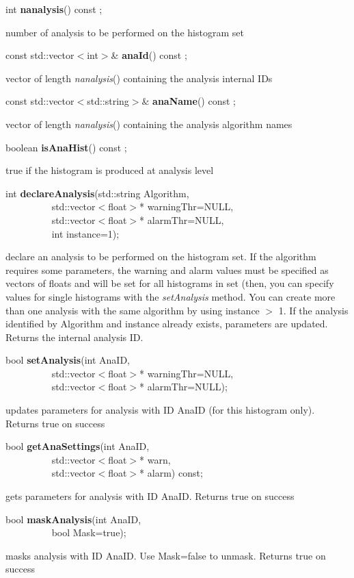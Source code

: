 \item    int {\bf nanalysis}() const ;

 number of analysis to be performed on the histogram set


\item    const std::vector$<$int$>$\& {\bf anaId}() const ;

 vector of length {\it  nanalysis}() containing the analysis internal IDs


\item    const std::vector$<$std::string$>$\& {\bf anaName}() const ;

 vector of length {\it  nanalysis}() containing the analysis algorithm names


\item    boolean {\bf isAnaHist}() const ;

 true if the histogram is produced at analysis level


\item    int {\bf declareAnalysis}(std::string Algorithm,\\\mbox{}~~~~~~~~~ 
		      std::vector$<$float$>$* warningThr=NULL,\\\mbox{}~~~~~~~~~ 
		      std::vector$<$float$>$* alarmThr=NULL,\\\mbox{}~~~~~~~~~ 
		      int instance=1);

 declare an analysis to be performed on the histogram set. If the algorithm
 requires some parameters, the warning and alarm values must be
 specified as vectors of floats and will be set for all histograms in
 set (then, you can specify values for single histograms with the {\it
 setAnalysis} method. 
 You can create more than one analysis
 with the same algorithm by using instance $>$ 1. If the analysis
 identified by Algorithm and instance already exists, parameters are
 updated. Returns the internal analysis ID.


\item    bool {\bf setAnalysis}(int AnaID,\\\mbox{}~~~~~~~~~ 
		   std::vector$<$float$>$* warningThr=NULL,\\\mbox{}~~~~~~~~~ 
		   std::vector$<$float$>$* alarmThr=NULL);

 updates parameters for analysis with ID AnaID (for this histogram only). Returns true on success


\item    bool {\bf getAnaSettings}(int AnaID,\\\mbox{}~~~~~~~~~
		      std::vector$<$float$>$* warn,\\\mbox{}~~~~~~~~~ 
		      std::vector$<$float$>$* alarm) const;

 gets parameters for analysis with ID AnaID. Returns true on success


\item    bool {\bf maskAnalysis}(int AnaID,\\\mbox{}~~~~~~~~~
		    bool Mask=true);

 masks analysis with ID AnaID. Use Mask=false to unmask. Returns true on success


